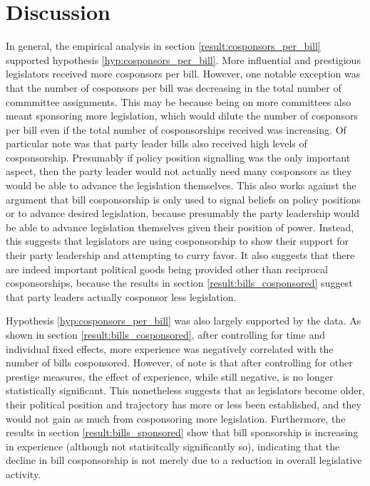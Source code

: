 \documentclass{article}
\begin{document}
  \section{Discussion}
  In general, the empirical analysis in section \ref{result:cosponsors_per_bill} supported hypothesis \ref{hyp:cosponsors_per_bill}. More influential and prestigious legislators received more cosponsors per bill. However, one notable exception was that the number of cosponsors per bill was decreasing in the total number of commmittee assignments. This may be because being on more committees also meant sponsoring more legislation, which would dilute the number of cosponsors per bill even if the total number of cosponsorships received was increasing. Of particular note was that party leader bills also received high levels of cosponsorship. Presumably if policy position signalling was the only important aspect, then the party leader would not actually need many cosponsors as they would be able to advance the legislation themselves. This also works against the argument that bill cosponsorship is only used to signal beliefs on policy positions or to advance desired legislation, because presumably the party leadership would be able to advance legislation themselves given their position of power. Instead, this suggests that legislators are using cosponsorship to show their support for their party leadership and attempting to curry favor. It also suggests that there are indeed important political goods being provided other than reciprocal cosponsorships, because the results in section \ref{result:bills_cosponsored} suggest that party leaders actually cosponsor less legislation. 

  Hypothesis \ref{hyp:cosponsors_per_bill} was also largely supported by the data. As shown in section \ref{result:bills_cosponsored}, after controlling for time and individual fixed effects, more experience was negatively correlated with the number of bills cosponsored. However, of note is that after controlling for other prestige measures, the effect of experience, while still negative, is no longer statistically significant. This nonetheless suggests that as legislators become older, their political position and trajectory has more or less been established, and they would not gain as much from cosponsoring more legislation. Furthermore, the results in section \ref{result:bills_sponsored} show that bill sponsorship is increasing in experience (although not statisitcally significantly so), indicating that the decline in bill cosponsorship is not merely due to a reduction in overall legislative activity. 
\end{document}
